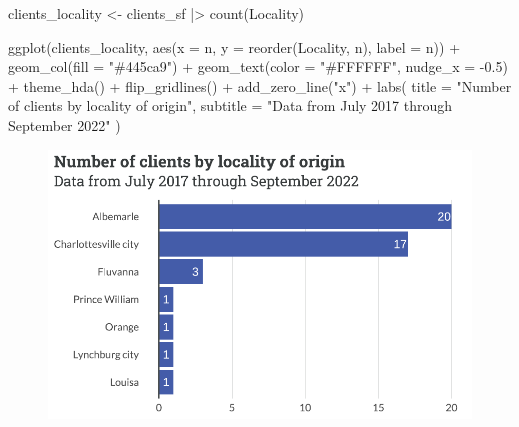 \documentclass[
  letterpaper,
  DIV=11,
  numbers=noendperiod]{scrartcl}
\newenvironment{Shaded}{\begin{snugshade}}{\end{snugshade}}
\newcommand{\AttributeTok}[1]{\textcolor[rgb]{0.40,0.45,0.13}{#1}}
\newcommand{\FloatTok}[1]{\textcolor[rgb]{0.68,0.00,0.00}{#1}}
\newcommand{\FunctionTok}[1]{\textcolor[rgb]{0.28,0.35,0.67}{#1}}
\newcommand{\NormalTok}[1]{\textcolor[rgb]{0.00,0.23,0.31}{#1}}
\newcommand{\OtherTok}[1]{\textcolor[rgb]{0.00,0.23,0.31}{#1}}
\newcommand{\SpecialCharTok}[1]{\textcolor[rgb]{0.37,0.37,0.37}{#1}}
\newcommand{\StringTok}[1]{\textcolor[rgb]{0.13,0.47,0.30}{#1}}
\begin{document}
\begin{Shaded}
\begin{Highlighting}[]
\NormalTok{clients\_locality }\OtherTok{\textless{}{-}}\NormalTok{ clients\_sf }\SpecialCharTok{|\textgreater{}} 
  \FunctionTok{count}\NormalTok{(Locality)}

\FunctionTok{ggplot}\NormalTok{(clients\_locality, }\FunctionTok{aes}\NormalTok{(}\AttributeTok{x =}\NormalTok{ n, }\AttributeTok{y =} \FunctionTok{reorder}\NormalTok{(Locality, n), }\AttributeTok{label =}\NormalTok{ n)) }\SpecialCharTok{+}
  \FunctionTok{geom\_col}\NormalTok{(}\AttributeTok{fill =} \StringTok{"\#445ca9"}\NormalTok{) }\SpecialCharTok{+}
  \FunctionTok{geom\_text}\NormalTok{(}\AttributeTok{color =} \StringTok{"\#FFFFFF"}\NormalTok{, }\AttributeTok{nudge\_x =} \SpecialCharTok{{-}}\FloatTok{0.5}\NormalTok{) }\SpecialCharTok{+}
  \FunctionTok{theme\_hda}\NormalTok{() }\SpecialCharTok{+}
  \FunctionTok{flip\_gridlines}\NormalTok{() }\SpecialCharTok{+}
  \FunctionTok{add\_zero\_line}\NormalTok{(}\StringTok{"x"}\NormalTok{) }\SpecialCharTok{+}
  \FunctionTok{labs}\NormalTok{(}
    \AttributeTok{title =} \StringTok{"Number of clients by locality of origin"}\NormalTok{,}
    \AttributeTok{subtitle =} \StringTok{"Data from July 2017 through September 2022"}
\NormalTok{  )}
\end{Highlighting}
\end{Shaded}

\begin{figure}[H]

{\centering \includegraphics{piedmont_files/figure-pdf/clients-locality-1.pdf}

}

\end{figure}
\end{document}
